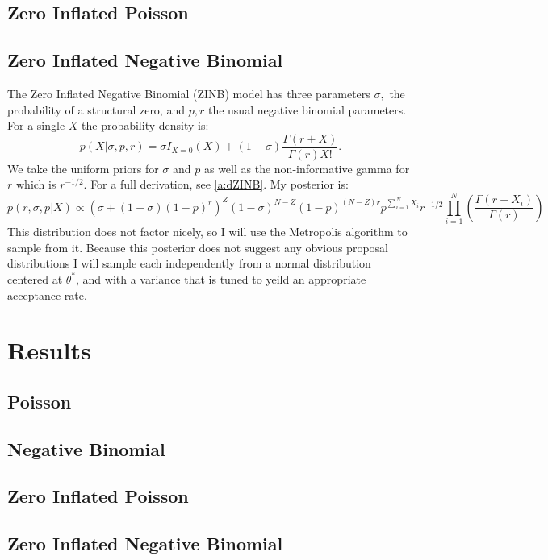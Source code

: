 \documentclass{article}
\begin{document}
\subsection{Zero Inflated Poisson}
\label{ss:mZiPoisson}

\subsection{Zero Inflated Negative Binomial}
\label{ss:mZiNBinom}
The Zero Inflated Negative Binomial (ZINB) model has three parameters $\sigma,$ the probability of a structural zero, and $p,r$ the usual negative binomial parameters. 
For a single $X$ the probability density is: 
$$p(X|\sigma, p, r) = \sigma I_{X=0}(X) + (1-\sigma)\frac{\Gamma(r+X)}{\Gamma(r)X!}.$$
We take the uniform priors for $\sigma$ and $p$ as well as the non-informative gamma for $r$ which is $r^{-1/2}$. For a full derivation, see \ref{a:dZINB}. My posterior is:
$$p(r,\sigma, p|X)\propto\left(\sigma + (1-\sigma)(1-p)^r\right)^Z(1-\sigma)^{N-Z}(1-p)^{(N-Z)r}p^{\sum_{i=1}^NX_i}r^{-1/2}\prod_{i=1}^N\left(\frac{\Gamma(r+X_i)}{\Gamma(r)}\right)$$
This distribution does not factor nicely, so I will use the Metropolis algorithm to sample from it. 
Because this posterior does not suggest any obvious proposal distributions I will sample each independently from a normal distribution centered at $\theta^*$, and with a variance that is tuned to yeild an appropriate acceptance rate.

\section{Results}
\label{s:results}
\subsection{Poisson}
\label{ss:rPoisson}

\subsection{Negative Binomial}
\label{ss:rNBinom}

\subsection{Zero Inflated Poisson}
\label{ss:rZiPoisson}

\subsection{Zero Inflated Negative Binomial}
\label{ss:rZiNBinom}
\end{document}
